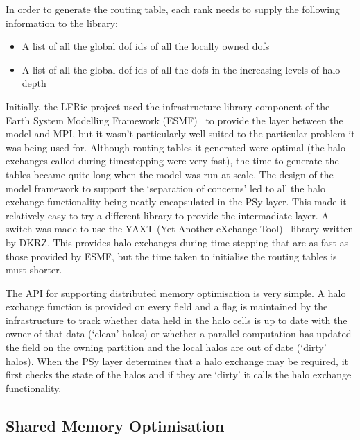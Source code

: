 \documentclass[review,times]{elsarticle}
\begin{document}
In order to generate the routing table, each rank needs to supply the
following information to the library:

\begin{itemize}

\item A list of all the global dof ids of all the locally owned dofs

\item A list of all the global dof ids of all the dofs in the increasing
levels of halo depth 

\end{itemize}

Initially, the LFRic project used the infrastructure library component
of the Earth System Modelling Framework (ESMF)~\cite{ESMFDocs} to
provide the layer between the model and MPI, but it wasn't particularly
well suited to the particular problem it was being used for. Although
routing tables it generated were optimal (the halo exchanges called
during timestepping were very fast), the time to generate the tables
became quite long when the model was run at scale. The design of the
model framework to support the `separation of concerns' led to all the
halo exchange functionality being neatly encapsulated in the PSy layer.
This made it relatively easy to try a different library to provide the
intermadiate layer. A switch was made to use the YAXT (Yet Another
eXchange Tool)~\cite{YAXTDocs} library written by DKRZ. This provides
halo exchanges during time stepping that are as fast as those provided
by ESMF, but the time taken to initialise the routing tables is must
shorter. 

The API for supporting distributed memory optimisation is very simple. A
halo exchange function is provided on every field and a flag is
maintained by the infrastructure to track whether data held in the halo
cells is up to date with the owner of that data (`clean' halos) or
whether a parallel computation has updated the field on the owning
partition and the local halos are out of date (`dirty' halos). When the
PSy layer determines that a halo exchange may be required, it first
checks the state of the halos and if they are `dirty' it calls the halo
exchange functionality.

\subsection{\label{sec:sharedmem}Shared Memory Optimisation}
\end{document}
